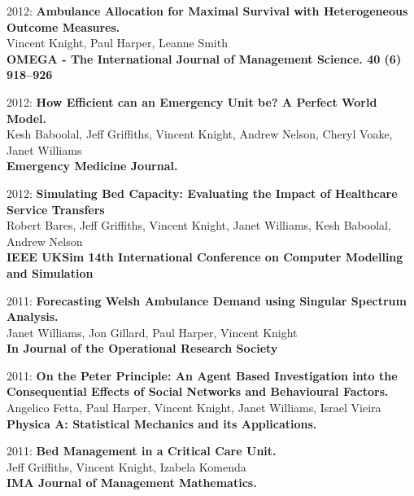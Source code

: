 \documentclass[10pt]{res} %
\begin{document}
\begin{resume}
\begin{etaremune}
\item
2012: \textbf{Ambulance Allocation for Maximal Survival with Heterogeneous Outcome Measures.}\\
Vincent Knight, Paul Harper, Leanne Smith
\\
\textbf{OMEGA - The International Journal of Management Science. 40 (6) 918--926}
\\

\item
2012: \textbf{How Efficient can an Emergency Unit be? A Perfect World Model.}\\
Kesh Baboolal, Jeff Griffiths, Vincent Knight, Andrew Nelson, Cheryl Voake, Janet Williams
\\
\textbf{Emergency Medicine Journal.}
\\

\item
2012: \textbf{Simulating Bed Capacity: Evaluating the Impact of Healthcare Service Transfers}\\
Robert Bares, Jeff Griffiths, Vincent Knight, Janet Williams, Kesh Baboolal, Andrew Nelson
\\
\textbf{IEEE UKSim 14th International Conference on Computer Modelling and Simulation}
\\

\item
2011: \textbf{Forecasting Welsh Ambulance Demand using Singular Spectrum Analysis.}\\
Janet Williams, Jon Gillard, Paul Harper, Vincent Knight
\\
\textbf{In Journal of the Operational Research Society}
\\

\item
2011: \textbf{On the Peter Principle: An Agent Based Investigation into the Consequential Effects of Social Networks and Behavioural Factors.}\\
Angelico Fetta, Paul Harper, Vincent Knight, Janet Williams, Israel Vieira
\\
\textbf{Physica A: Statistical Mechanics and its Applications.}
\\

\item
2011: \textbf{Bed Management in a Critical Care Unit.}\\
Jeff Griffiths, Vincent Knight, Izabela Komenda
\\
\textbf{IMA Journal of Management Mathematics.}
\\


\end{etaremune}
\end{resume}
\end{document}
